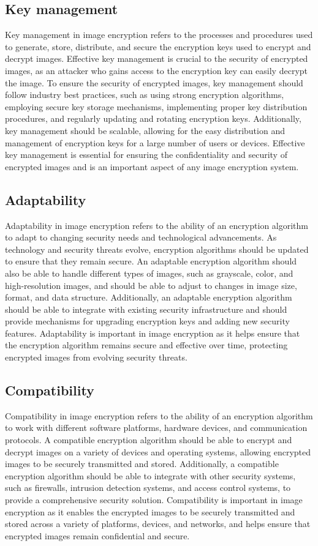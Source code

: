 \documentclass[11pt,a4paper,english]{article}
\begin{document}
\subsection{Key management}Key management in image encryption refers to the processes and procedures used to generate, store, distribute, and secure the encryption keys used to encrypt and decrypt images. Effective key management is crucial to the security of encrypted images, as an attacker who gains access to the encryption key can easily decrypt the image. To ensure the security of encrypted images, key management should follow industry best practices, such as using strong encryption algorithms, employing secure key storage mechanisms, implementing proper key distribution procedures, and regularly updating and rotating encryption keys. Additionally, key management should be scalable, allowing for the easy distribution and management of encryption keys for a large number of users or devices. Effective key management is essential for ensuring the confidentiality and security of encrypted images and is an important aspect of any image encryption system.
\subsection{Adaptability}Adaptability in image encryption refers to the ability of an encryption algorithm to adapt to changing security needs and technological advancements. As technology and security threats evolve, encryption algorithms should be updated to ensure that they remain secure. An adaptable encryption algorithm should also be able to handle different types of images, such as grayscale, color, and high-resolution images, and should be able to adjust to changes in image size, format, and data structure. Additionally, an adaptable encryption algorithm should be able to integrate with existing security infrastructure and should provide mechanisms for upgrading encryption keys and adding new security features. Adaptability is important in image encryption as it helps ensure that the encryption algorithm remains secure and effective over time, protecting encrypted images from evolving security threats.
\subsection{Compatibility}Compatibility in image encryption refers to the ability of an encryption algorithm to work with different software platforms, hardware devices, and communication protocols. A compatible encryption algorithm should be able to encrypt and decrypt images on a variety of devices and operating systems, allowing encrypted images to be securely transmitted and stored. Additionally, a compatible encryption algorithm should be able to integrate with other security systems, such as firewalls, intrusion detection systems, and access control systems, to provide a comprehensive security solution. Compatibility is important in image encryption as it enables the encrypted images to be securely transmitted and stored across a variety of platforms, devices, and networks, and helps ensure that encrypted images remain confidential and secure.
\end{document}
